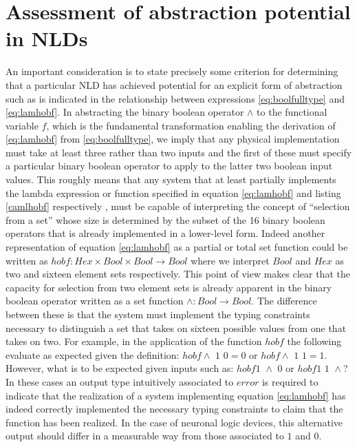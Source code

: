 \section{Assessment of abstraction potential in NLDs}

An important consideration is to state precisely some criterion for
determining that a particular NLD has achieved potential for an explicit
form of abstraction such as is indicated in the relationship between
expressions \ref{eq:boolfulltype} and
\ref{eq:lamhobf}. In abstracting the binary boolean
operator $\wedge$ to the functional variable
$f$, which is the fundamental
transformation enabling the derivation of
\ref{eq:lamhobf} from
\ref{eq:boolfulltype}, we imply that any physical
implementation must take at least three rather than two inputs and the
first of these must specify a particular binary boolean operator to
apply to the latter two boolean input values. This roughly means that
any system that at least partially implements the lambda expression or
function specified in equation \ref{eq:lamhobf} and
listing \ref{camlhobf} respectively , must be capable of
interpreting the concept of ``selection from a set'' whose size is
determined by the subset of the 16 binary boolean operators that is
already implemented in a lower-level form. Indeed another representation
of equation \ref{eq:lamhobf} as a partial or total
set function could be written as $hobf : Hex \times Bool \times Bool \rightarrow Bool$
where we interpret $Bool$ and
$Hex$ as two and sixteen element sets
respectively. This point of view makes clear that the capacity for
selection from two element sets is already apparent in the binary
boolean operator written as a set function
$\wedge : Bool \rightarrow Bool$. The difference between these is
that the system must implement the typing constraints necessary to
distinguish a set that takes on sixteen possible values from one that
takes on two. For example, in the application of the function
$hobf$ the following evaluate as expected
given the definition: $hobf \wedge \,\, 1\,\, 0=0$ or
$hobf \wedge \,\, 1\,\, 1=1$. However, what is to be expected
given inputs such as: $hobf 1 \,\, \wedge\,\, 0$ or
$hobf 1 \,\, 1\,\, \wedge$? In these cases an output type
intuitively associated to $error$ is
required to indicate that the realization of a system implementing
equation \ref{eq:lamhobf} has indeed correctly
implemented the necessary typing constraints to claim that the function
has been realized. In the case of neuronal logic devices, this
alternative output should differ in a measurable way from those
associated to $1$ and $0$.

